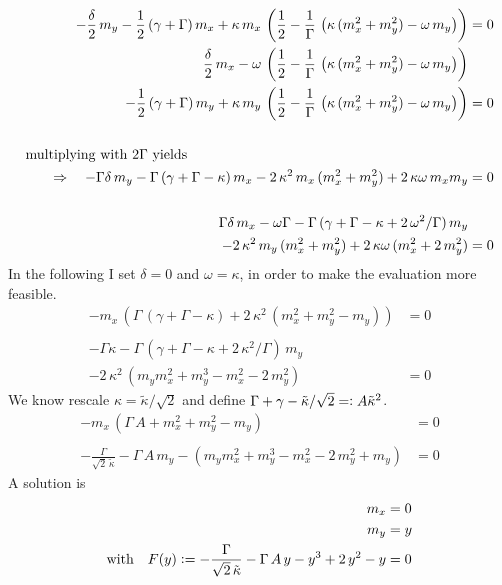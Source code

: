\documentclass{article}
\begin{document}
\begin{align*}
    -\frac{\delta}{2}\,m_y-\half\,(\gamma+\Gamma)\,m_x+\kappa\,m_x\,\left( \half-\frac{1}{\Gamma}\,\left(\kappa\,(m_x^2+ m_y^2)-\omega\,m_y  \right)  \right)&=0\\
    \frac{\delta}{2}\,m_x-\omega\,\left( \half-\frac{1}{\Gamma}\,\left(\kappa\,(m_x^2+ m_y^2)-\omega\,m_y  \right)  \right)&\\-\half\,(\gamma+\Gamma)\,m_y+\kappa\,m_y\,\left( \half-\frac{1}{\Gamma}\,\left(\kappa\,(m_x^2+ m_y^2)-\omega\,m_y  \right)  \right)&=0\\\\
    \text{multiplying with }2\Gamma\text{ yields}\quad\quad\quad\hspace*{6cm}&
    \\\Rightarrow\quad-\Gamma\delta\,m_y-\Gamma\,(\gamma+\Gamma-\kappa)\,m_x-2\,\kappa^2\,m_x\,( m_x^2+ m_y^2)+2\,\kappa\omega\,m_xm_y  &=0\\\\
    \Gamma\delta\,m_x-\omega\Gamma-\Gamma\,(\gamma+\Gamma-\kappa+2\,\omega^2/\Gamma)\,m_y&\\
    -2\,\kappa^2\,m_y\,( m_x^2+ m_y^2)+2\,\kappa\omega\,(m_x^2+2\,m_y^2)  &=0
\end{align*}
In the following I set $\delta=0$ and $\omega=\kappa$, in order to make the evaluation more feasible.
\begin{align*}
    -m_x\,\left( \Gamma\,(\gamma+\Gamma-\kappa)+2\,\kappa^2\,\left( m_x^2+ m_y^2-m_y\right)\right)&=0\\\\ 
    -\Gamma\kappa-\Gamma\,(\gamma+\Gamma-\kappa+2\,\kappa^2/\Gamma)\,m_y&\\
    -2\,\kappa^2\,\left( m_ym_x^2+ m_y^3-m_x^2-2\,m_y^2\right) &=0
\end{align*}
We know rescale $\kappa=\tilde{\kappa}/\sqrt{2}$ and define $\Gamma+\gamma-\tilde{\kappa}/\sqrt{2}=\vcentcolon A\tilde{\kappa}^2$.
\begin{align*}
    -m_x\,\left( \Gamma\,A+m_x^2 +m_y^2-m_y\right)&=0\\\\ 
    -\frac{\Gamma}{\sqrt{2}\,\tilde{\kappa}}-\Gamma\,A\,m_y-\left( m_ym_x^2+ m_y^3-m_x^2-2\,m_y^2+m_y\right) &=0
\end{align*}
A solution is
\begin{align*}
    m_x&=0\\
    m_y&=y\\
    \text{with}\quad F(y)\vcentcolon=-\frac{\Gamma}{\sqrt{2}\,\tilde{\kappa}}-\Gamma\,A\,y-y^3+2\,y^2-y &=0
\end{align*}
\end{document}

